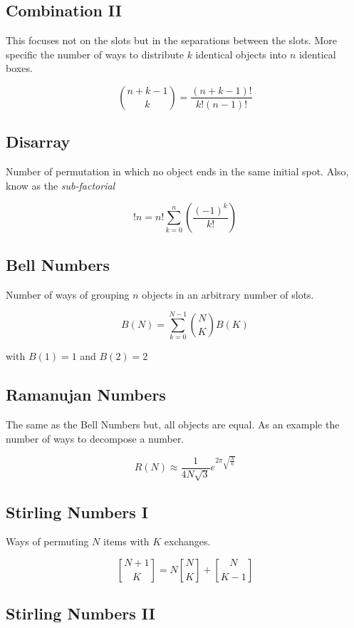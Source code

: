 \subsection{Combination II}

This focuses not on the slots but in the separations between the slots.
More specific the number of ways to distribute \(k\) identical objects into \(n\) identical boxes. 

\[
    \binom{n + k - 1}{k} = \frac{(n + k - 1)!}{k!(n - 1)!}
\]

\subsection{Disarray}

Number of permutation in which no object ends in the same initial spot. Also, know as the 
\emph{sub-factorial}

\[
    !n = n! \sum_{k = 0}^{n} \left(\frac{{(-1)}^k}{k!}\right)
\]

\subsection{Bell Numbers}

Number of ways of grouping \(n\) objects in an arbitrary number of slots.

\[
    B(N) = \sum_{k = 0}^{N-1}\binom{N}{K}B(K)
\]

with \(B(1) = 1\) and \(B(2) = 2\)

\subsection{Ramanujan Numbers}

The same as the Bell Numbers but, all objects are equal. As an example the number of ways
to decompose a number.

\[
    R(N) \approx \frac{1}{4N\sqrt{3}} e^{2\pi \sqrt{\frac{N}{6}}}
\]

\subsection{Stirling Numbers I}

Ways of permuting \(N\) items with \(K\) exchanges.

\[
    \genfrac{[}{]}{0pt}{}{N + 1}{K} = N \genfrac{[}{]}{0pt}{}{N}{K} + \genfrac{[}{]}{0pt}{}{N}{K - 1}
\]


\subsection{Stirling Numbers II}

